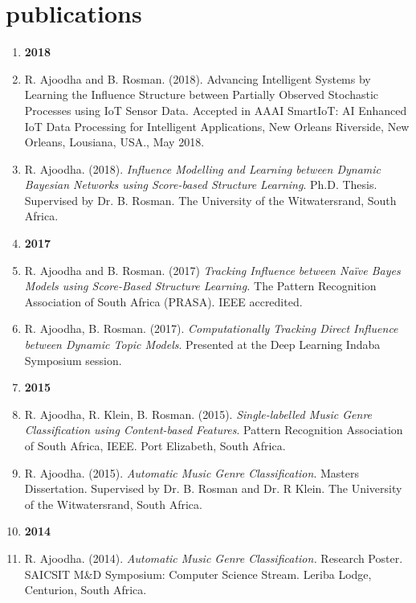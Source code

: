 \documentclass[]{friggeri-cv} %
\begin{document}
\section{publications}
\begin{enumerate}
\item[] {\large \bf 2018}

\item[]	R. Ajoodha and B. Rosman. (2018). Advancing Intelligent Systems by Learning the Influence Structure between Partially Observed Stochastic Processes using IoT Sensor Data. Accepted in AAAI SmartIoT: AI Enhanced IoT Data Processing for Intelligent Applications, New Orleans Riverside, New Orleans, Lousiana, USA., May 2018.

\item[]	R. Ajoodha. (2018). {\it Influence Modelling and Learning between Dynamic Bayesian Networks using Score-based Structure Learning}. Ph.D. Thesis. Supervised by Dr. B. Rosman. The University of the Witwatersrand, South Africa.	
	
\item[] {\large \bf 2017}	
	
\item[]	R. Ajoodha and B. Rosman. (2017) \textit{Tracking Influence between Naïve Bayes Models using Score-Based Structure Learning.} The Pattern Recognition Association of South Africa (PRASA). IEEE accredited.

\item[]	R. Ajoodha, B. Rosman. (2017). {\it Computationally Tracking Direct Influence between Dynamic Topic Models}. Presented at the Deep Learning Indaba Symposium session. 

\item[] {\large \bf 2015}
	
\item[]	R. Ajoodha, R. Klein, B. Rosman. (2015). {\it Single-labelled Music Genre Classification using Content-based Features}. Pattern Recognition Association of South Africa, IEEE. Port Elizabeth, South Africa.
	
\item[]	R. Ajoodha. (2015). {\it Automatic Music Genre Classification}. Masters Dissertation. Supervised by Dr. B. Rosman and Dr. R Klein. The University of the Witwatersrand, South Africa.

\item[] {\large \bf 2014}

\item[]	R. Ajoodha. (2014). {\it Automatic Music Genre Classification.} Research Poster. SAICSIT M\&D Symposium: Computer Science Stream. Leriba Lodge, Centurion, South Africa.
	

\end{enumerate}
\end{document}
